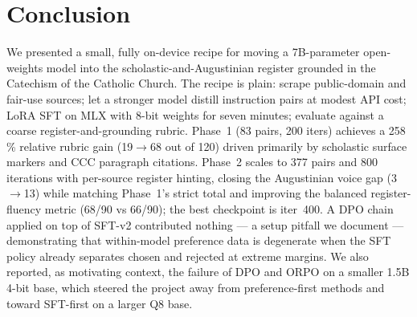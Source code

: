 \section{Conclusion}
\label{sec:conclusion}

We presented a small, fully on-device recipe for moving a 7B-parameter
open-weights model into the scholastic-and-Augustinian register grounded
in the Catechism of the Catholic Church. The recipe is plain: scrape
public-domain and fair-use sources; let a stronger model distill
instruction pairs at modest API cost; LoRA SFT on MLX with 8-bit weights
for seven minutes; evaluate against a coarse register-and-grounding
rubric. Phase~1 (83 pairs, 200 iters) achieves a 258\,\% relative rubric
gain (19$\to$68 out of 120) driven primarily by scholastic surface
markers and CCC paragraph citations. Phase~2 scales to 377 pairs and 800
iterations with per-source register hinting, closing the Augustinian
voice gap (3$\to$13) while matching Phase~1's strict total and improving
the balanced register-fluency metric (68/90 vs 66/90); the best
checkpoint is iter~400. A DPO chain applied on top of SFT-v2 contributed
nothing --- a setup pitfall we document --- demonstrating that
within-model preference data is degenerate when the SFT policy already
separates chosen and rejected at extreme margins. We also reported, as
motivating context, the failure of DPO and ORPO on a smaller 1.5B 4-bit
base, which steered the project away from preference-first methods and
toward SFT-first on a larger Q8 base.

